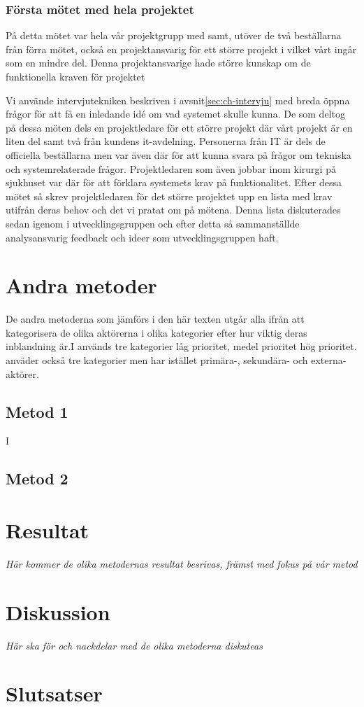 \subsubsection{Första mötet med hela projektet}
På detta mötet var hela vår projektgrupp med samt, utöver de två beställarna från förra mötet, också en projektansvarig för ett större projekt i vilket vårt ingår som en mindre del. Denna projektansvarige hade större kunskap om de funktionella kraven för projektet 

Vi använde intervjutekniken beskriven i avsnit\ref{sec:ch-intervju} med breda öppna frågor för att få en inledande idé om vad systemet skulle kunna. De som deltog på dessa möten dels en projektledare för ett större projekt där vårt projekt är en liten del samt två från kundens it-avdelning. Personerna från IT är dels de officiella beställarna men var även där för att kunna svara på frågor om tekniska och systemrelaterade frågor. Projektledaren som även jobbar inom kirurgi på sjukhuset var där för att förklara systemets krav på funktionalitet. Efter dessa mötet så skrev projektledaren för det större projektet upp en lista med krav utifrån deras behov och det vi pratat om på mötena. Denna lista diskuterades sedan igenom i utvecklingsgruppen och efter detta så sammanställde analysansvarig feedback och ideer som utvecklingsgruppen haft. 

\section{Andra metoder}
De andra metoderna som jämförs i den här texten utgår alla ifrån att kategorisera de olika aktörerna i olika kategorier efter hur viktig deras inblandning är.I \cite{cs_novel} används tre kategorier låg prioritet, medel prioritet hög prioritet. \cite{cs_sturctured} anväder också tre kategorier men har istället primära-, sekundära- och externa-aktörer. 

\subsection{Metod 1}
I \cite{cs_novel} 
\subsection{Metod 2}

\section{Resultat}
\emph{Här kommer de olika metodernas resultat besrivas, främst med fokus på vår metod}


\section{Diskussion}
\emph{Här ska för och nackdelar med de olika metoderna diskuteas}

\section{Slutsatser}





